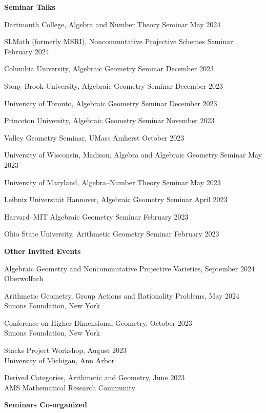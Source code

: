 \documentclass[11 pt]{letter}
\begin{document}
	\medskip
	\noindent
	\textbf{\large{Seminar Talks}}

	Dartmouth College, Algebra and Number Theory Seminar \hfill May 2024

	SLMath (formerly MSRI), Noncommutative Projective Schemes Seminar \hfill February 2024

	Columbia University, Algebraic Geometry Seminar \hfill December 2023

	Stony Brook University, Algebraic Geometry Seminar \hfill December 2023

	University of Toronto, Algebraic Geometry Seminar \hfill December 2023

	Princeton University, Algebraic Geometry Seminar \hfill November 2023

	Valley Geometry Seminar, UMass Amherst \hfill October 2023

	University of Wisconsin, Madison, Algebra and Algebraic Geometry Seminar \hfill May 2023

	University of Maryland, Algebra--Number Theory Seminar \hfill May 2023

	Leibniz Universit\"at Hannover, Algebraic Geometry Seminar \hfill April 2023

	Harvard--MIT Algebraic Geometry Seminar \hfill February 2023

	Ohio State University, Arithmetic Geometry Seminar \hfill February 2023



	\medskip
	\noindent
	\textbf{Other Invited Events}

	Algebraic Geometry and Noncommutative Projective Varieties, \hfill September 2024 \\
	\indent Oberwolfach

	Arithmetic Geometry, Group Actions and Rationality Problems, \hfill May 2024 \\
	\indent Simons Foundation, New York

	Conference on Higher Dimensional Geometry, \hfill October 2023 \\
	\indent Simons Foundation, New York

	Stacks Project Workshop, \hfill August 2023 \\
	\indent University of Michigan, Ann Arbor 

	Derived Categories, Arithmetic and Geometry, \hfill June 2023 \\
	\indent AMS Mathematical Research Community 


	
	\medskip
	\noindent
	\textbf{\large{Seminars Co-organized}}
\end{document}
